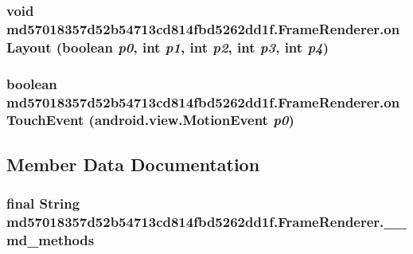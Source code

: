 \hypertarget{classmd57018357d52b54713cd814fbd5262dd1f_1_1_frame_renderer_af0948288e17edaaabea73769edf9c2a}{
\subsubsection[{onLayout}]{\setlength{\rightskip}{0pt plus 5cm}void md57018357d52b54713cd814fbd5262dd1f.FrameRenderer.onLayout (boolean {\em p0}, \/  int {\em p1}, \/  int {\em p2}, \/  int {\em p3}, \/  int {\em p4})}}
\label{classmd57018357d52b54713cd814fbd5262dd1f_1_1_frame_renderer_af0948288e17edaaabea73769edf9c2a}


\hypertarget{classmd57018357d52b54713cd814fbd5262dd1f_1_1_frame_renderer_ea790f7f0f5e6f35f6ba260beeea4479}{
\subsubsection[{onTouchEvent}]{\setlength{\rightskip}{0pt plus 5cm}boolean md57018357d52b54713cd814fbd5262dd1f.FrameRenderer.onTouchEvent (android.view.MotionEvent {\em p0})}}
\label{classmd57018357d52b54713cd814fbd5262dd1f_1_1_frame_renderer_ea790f7f0f5e6f35f6ba260beeea4479}




\subsection{Member Data Documentation}
\hypertarget{classmd57018357d52b54713cd814fbd5262dd1f_1_1_frame_renderer_166d3c4d9a96ccf8eb5ff4a0bf70b76f}{
\subsubsection[{\_\-\_\-md\_\-methods}]{\setlength{\rightskip}{0pt plus 5cm}final String {\bf md57018357d52b54713cd814fbd5262dd1f.FrameRenderer.\_\-\_\-md\_\-methods}}}
\label{classmd57018357d52b54713cd814fbd5262dd1f_1_1_frame_renderer_166d3c4d9a96ccf8eb5ff4a0bf70b76f}




